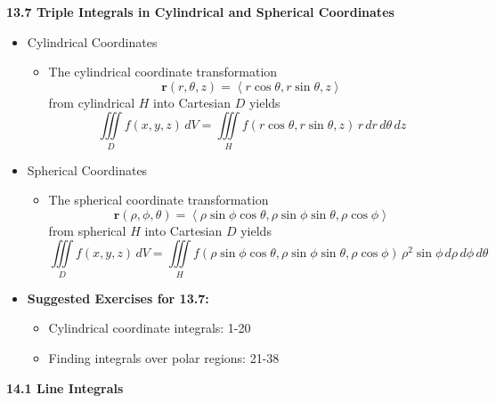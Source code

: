 \documentclass[12pt]{article}
\renewcommand{\vec}[1]{\mathbf{#1}}
\newcommand{\dvar}[1]{\,d{#1}}
\renewcommand{\d}[1]{\dvar{#1}}
\newcommand{\<}{\left<}
\renewcommand{\>}{\right>}
\begin{document}
  \newpage
  
  \centerline{\bf 13.7 Triple Integrals in Cylindrical and Spherical Coordinates}
  
  \begin{itemize}
  
  \item Cylindrical Coordinates
    \begin{itemize}
    \item The cylindrical coordinate transformation \[\vec{r}(r,\theta,z) = \<r\cos\theta, r\sin\theta, z\>\] from cylindrical $H$ into Cartesian $D$ yields \[\iiint\limits_D f(x,y,z)\d{V} = \iiint\limits_H f(r\cos\theta,r\sin\theta,z)\,r\d{r}\d{\theta}\d{z}\]
    \end{itemize}
  
  \item Spherical Coordinates
    \begin{itemize}
    \item The spherical coordinate transformation \[\vec{r}(\rho,\phi,\theta)=\<\rho\sin\phi\cos\theta, \rho\sin\phi\sin\theta, \rho\cos\phi\>\] from spherical $H$ into Cartesian $D$ yields \[\iiint\limits_D f(x,y,z)\, dV = \iiint\limits_H f(\rho\sin\phi\cos\theta,\rho\sin\phi\sin\theta,\rho\cos\phi) \,\rho^2\sin\phi\dvar{\rho}\dvar{\phi}\dvar{\theta} \]
    \end{itemize}
      
  \item \textbf{Suggested Exercises for 13.7:}
  
    \begin{itemize}
    \item Cylindrical coordinate integrals: 1-20
    \item Finding integrals over polar regions: 21-38
    \end{itemize}
  
  \end{itemize}
  
  \newpage
  
  \centerline{\bf 14.1 Line Integrals}
\end{document}
